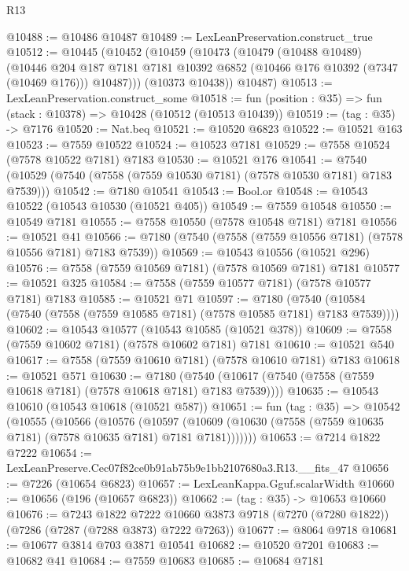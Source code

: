 \begin{lexlean}{R13}
\begin{coremodule}
@10488 := @10486 @10487
@10489 := LexLeanPreservation.construct_true
@10512 := @10445
    (@10452
      (@10459
        (@10473
          (@10479
            (@10488 @10489)
            (@10446
              @204
              @187
              @7181
              @7181
              @10392
              @6852
              (@10466 @176 @10392 (@7347 (@10469 @176)))
              @10487)))
        (@10373 @10438))
      @10487)
@10513 := LexLeanPreservation.construct_some
@10518 := fun (position : @35) => fun (stack : @10378) => @10428 (@10512 (@10513 @10439))
@10519 := (tag : @35) -> @7176
@10520 := Nat.beq
@10521 := @10520 @6823
@10522 := @10521 @163
@10523 := @7559 @10522
@10524 := @10523 @7181
@10529 := @7558 @10524 (@7578 @10522 @7181) @7183
@10530 := @10521 @176
@10541 := @7540 (@10529 (@7540 (@7558 (@7559 @10530 @7181) (@7578 @10530 @7181) @7183 @7539)))
@10542 := @7180 @10541
@10543 := Bool.or
@10548 := @10543 @10522 (@10543 @10530 (@10521 @405))
@10549 := @7559 @10548
@10550 := @10549 @7181
@10555 := @7558 @10550 (@7578 @10548 @7181) @7181
@10556 := @10521 @41
@10566 := @7180 (@7540 (@7558 (@7559 @10556 @7181) (@7578 @10556 @7181) @7183 @7539))
@10569 := @10543 @10556 (@10521 @296)
@10576 := @7558 (@7559 @10569 @7181) (@7578 @10569 @7181) @7181
@10577 := @10521 @325
@10584 := @7558 (@7559 @10577 @7181) (@7578 @10577 @7181) @7183
@10585 := @10521 @71
@10597 := @7180
    (@7540 (@10584 (@7540 (@7558 (@7559 @10585 @7181) (@7578 @10585 @7181) @7183 @7539))))
@10602 := @10543 @10577 (@10543 @10585 (@10521 @378))
@10609 := @7558 (@7559 @10602 @7181) (@7578 @10602 @7181) @7181
@10610 := @10521 @540
@10617 := @7558 (@7559 @10610 @7181) (@7578 @10610 @7181) @7183
@10618 := @10521 @571
@10630 := @7180
    (@7540 (@10617 (@7540 (@7558 (@7559 @10618 @7181) (@7578 @10618 @7181) @7183 @7539))))
@10635 := @10543 @10610 (@10543 @10618 (@10521 @587))
@10651 := fun (tag : @35) =>
  @10542
    (@10555
      (@10566
        (@10576
          (@10597
            (@10609 (@10630 (@7558 (@7559 @10635 @7181) (@7578 @10635 @7181) @7181 @7181)))))))
@10653 := @7214 @1822 @7222
@10654 := LexLeanPreserve.Cec07f82ce0b91ab75b9e1bb2107680a3.R13.__fits_47
@10656 := @7226 (@10654 @6823)
@10657 := LexLeanKappa.Gguf.scalarWidth
@10660 := @10656 (@196 (@10657 @6823))
@10662 := (tag : @35) -> @10653 @10660
@10676 := @7243
    @1822
    @7222
    @10660
    @3873
    @9718
    (@7270 (@7280 @1822))
    (@7286 (@7287 (@7288 @3873) @7222 @7263))
@10677 := @8064 @9718
@10681 := @10677 @3814 @703 @3871 @10541
@10682 := @10520 @7201
@10683 := @10682 @41
@10684 := @7559 @10683
@10685 := @10684 @7181

\end{coremodule}
\end{lexlean}
